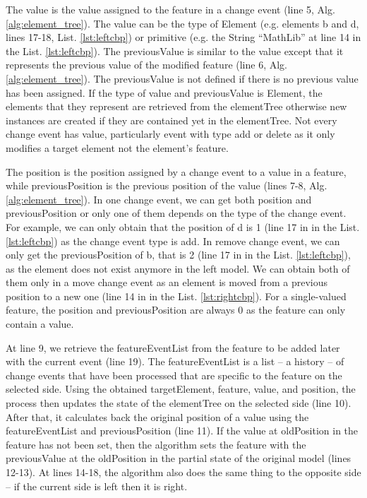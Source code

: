 \documentclass{jot}
\begin{document}
The \textsf{value} is the value assigned to the feature in a change event (line 5, Alg. \ref{alg:element_tree}). The \textsf{value} can be the type of \textsf{Element} (e.g. elements \textsf{b} and  \textsf{d}, lines 17-18, List. \ref{lst:leftcbp}) or primitive (e.g. the String ``MathLib'' at line 14 in the List. \ref{lst:leftcbp}). The \textsf{previousValue} is similar to the \textsf{value} except that it represents the previous value of the modified feature (line 6, Alg. \ref{alg:element_tree}). The \textsf{previousValue} is not defined if there is no previous value has been assigned. If the type of \textsf{value} and \textsf{previousValue} is \textsf{Element}, the elements that they represent are retrieved from the \textsf{elementTree} otherwise new instances are created if they are contained yet in the \textsf{elementTree}. Not every change event has \textsf{value}, particularly event with type \textsf{add} or \textsf{delete} as it only modifies a target element not the element's feature.

The \textsf{position} is the position assigned by a change event to a value in a feature, while \textsf{previousPosition} is the previous position of the value (lines 7-8, Alg. \ref{alg:element_tree}). In one change event, we can get both \textsf{position} and \textsf{previousPosition} or only one of them depends on the type of the change event. For example, we can only obtain that the \textsf{position} of \textsf{d} is 1 (line 17 in in the List. \ref{lst:leftcbp}) as the change event type is \textsf{add}. In \textsf{remove} change event, we can only get the \textsf{previousPosition} of \textsf{b}, that is 2 (line 17 in in the List. \ref{lst:leftcbp}), as the element does not exist anymore in the left model. We can obtain both of them only in a \textsf{move} change event as an element is moved from a previous position to a new one (line 14 in in the List. \ref{lst:rightcbp}). For a single-valued feature, the \textsf{position} and \textsf{previousPosition} are always 0 as the feature can only contain a value. 

At line 9, we retrieve the \textsf{featureEventList} from the \textsf{feature} to be added later with the current \textsf{event} (line 19). The \textsf{featureEventList} is a list -- a history -- of change events that have been processed that are specific to the \textsf{feature} on the selected \textsf{side}. Using the obtained \textsf{targetElement}, \textsf{feature}, \textsf{value}, and \textsf{position}, the process then updates the state of the \textsf{elementTree} on the selected \textsf{side} (line 10). After that, it calculates back the original position of a value using the \textsf{featureEventList} and \textsf{previousPosition} (line 11). If the value at \textsf{oldPosition} in the \textsf{feature} has not been set, then the algorithm sets the \textsf{feature} with the \textsf{previousValue} at the \textsf{oldPosition} in the partial state of the original model (lines 12-13). At lines 14-18, the algorithm also does the same thing to the opposite side -- if the current \textsf{side} is \textsf{left} then it is \textsf{right}.  
\end{document}
